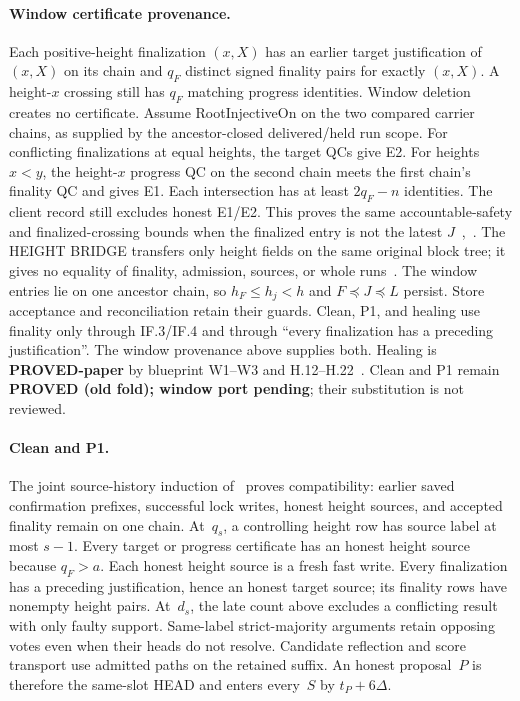 \documentclass{article}
\theoremstyle{plain}
\theoremstyle{definition}
\theoremstyle{remark}
\begin{document}
\paragraph{Window certificate provenance.}
Each positive-height finalization $(x,X)$ has an earlier target
justification of $(x,X)$ on its chain and $q_F$ distinct signed finality
pairs for exactly $(x,X)$.  A height-$x$ crossing still has $q_F$
matching progress identities.  Window deletion creates no certificate.
Assume \textsf{RootInjectiveOn} on the two compared carrier chains,
as supplied by the ancestor-closed delivered/held run scope.
For conflicting finalizations at equal heights, the target QCs give E2.
For heights $x<y$, the height-$x$ progress QC on the second chain meets
the first chain's finality QC and gives E1.  Each intersection has at
least $2q_F-n$ identities.  The client record still excludes honest E1/E2.
This proves the same accountable-safety and finalized-crossing bounds
when the finalized entry is not the latest $J$~\cite[\S4]{FW},~\cite[\S\S3--4,8]{BPFN}.
The HEIGHT BRIDGE transfers only height fields on the same original block tree;
it gives no equality of finality, admission, sources, or whole runs~\cite[\S3.1a]{BPFN}.
The window entries lie on one ancestor chain, so $h_F\leq h_j<h$ and
$F\preceq J\preceq L$ persist.  Store acceptance and reconciliation
retain their guards.  Clean, P1, and healing use finality only through
IF.3/IF.4 and through ``every finalization has a preceding justification''.
The window provenance above supplies both. Healing is \textbf{PROVED-paper}
by blueprint W1--W3 and H.12--H.22~\cite{BPH}. Clean and P1 remain
\textbf{PROVED (old fold); window port pending}; their substitution is not reviewed.

\paragraph{Clean and P1.}  The joint source-history induction
of~\cite[\S4]{FB} proves compatibility: earlier saved confirmation prefixes,
successful lock writes, honest height sources, and accepted finality
remain on one chain.  At~$q_s$, a controlling height row has source
label at most $s-1$.  Every target or progress certificate has an
honest height source because $q_F>a$.  Each honest height source is a
fresh fast write.  Every finalization has a preceding justification,
hence an honest target source; its finality rows have nonempty
height pairs.  At~$d_s$, the late count above excludes a conflicting result with only
faulty support.  Same-label strict-majority arguments retain opposing
votes even when their heads do not resolve.  Candidate reflection and
score transport use admitted paths on the retained suffix.  An honest
proposal~$P$ is therefore the same-slot HEAD and enters every~$S$ by
$t_P+6\Delta$.
\end{document}
